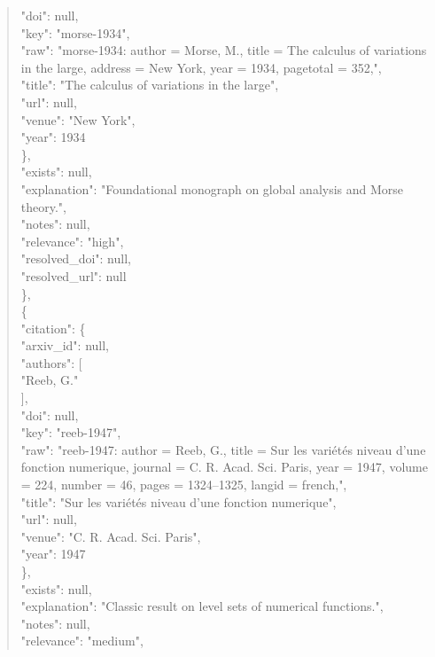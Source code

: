 \documentclass[11pt]{article}
\begin{document}
\begin{quote}
        "doi": null,\\
        "key": "morse-1934",\\
        "raw": "morse-1934: author = Morse, M., title = The calculus of variations in the large, address = New York, year = 1934, pagetotal = 352,",\\
        "title": "The calculus of variations in the large",\\
        "url": null,\\
        "venue": "New York",\\
        "year": 1934\\
      \},\\
      "exists": null,\\
      "explanation": "Foundational monograph on global analysis and Morse theory.",\\
      "notes": null,\\
      "relevance": "high",\\
      "resolved\_doi": null,\\
      "resolved\_url": null\\
    \},\\
    \{\\
      "citation": \{\\
        "arxiv\_id": null,\\
        "authors": [\\
          "Reeb, G."\\
        ],\\
        "doi": null,\\
        "key": "reeb-1947",\\
        "raw": "reeb-1947: author = Reeb, G., title = Sur les variétés niveau d'une fonction numerique, journal = C. R. Acad. Sci. Paris, year = 1947, volume = 224, number = 46, pages = 1324--1325, langid = french,",\\
        "title": "Sur les variétés niveau d'une fonction numerique",\\
        "url": null,\\
        "venue": "C. R. Acad. Sci. Paris",\\
        "year": 1947\\
      \},\\
      "exists": null,\\
      "explanation": "Classic result on level sets of numerical functions.",\\
      "notes": null,\\
      "relevance": "medium",\\

\end{quote}
\end{document}
